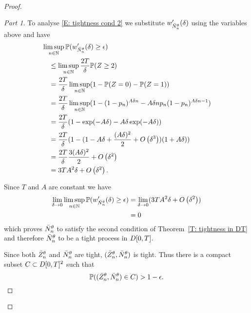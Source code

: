 \begin{proof}
\begin{proof}[Part 1]
To analyse \eqref{E: tightness cond 2} we substitute $w'_{\bar{N}_n^{\theta}}(\delta)$ using the variables above and have
\begin{equation}
\begin{aligned}
&\limsup_{n \in \mathbb{N}}\mathbb{P}(w'_{\bar{N}_n^{\theta}}(\delta) \geq \epsilon ) \\
&\quad\leq \limsup_{n \in \mathbb{N}}\frac{2T}{\delta} \mathbb{P}( Z \geq 2 ) \\
&\quad= \frac{2T}{\delta} \limsup_{n \in \mathbb{N}}(1 - \mathbb{P}( Z = 0 ) - \mathbb{P}( Z = 1 )) \\
&\quad= \frac{2T}{\delta} \limsup_{n \in \mathbb{N}}(1 - (1- p_n)^{A\delta n} - A\delta n p_n (1 - p_n)^{A\delta n - 1}) \\
&\quad= \frac{2T}{\delta} (1 - \exp(-A\delta) - A\delta\exp(-A\delta) ) \\
&\quad= \frac{2T}{\delta}(  1 - (1- A\delta + \frac{(A\delta)^2}{2} + O\left(\delta^3\right))(1 + A\delta ) ) \\
&\quad= \frac{2T}{\delta} \frac{3(A\delta)^2}{2} + O\left(\delta^2\right) \\
&\quad= 3TA^2\delta + O\left(\delta^2\right).
\end{aligned}
\end{equation}

Since $T$ and $A$ are constant we have
\begin{equation}
	\begin{aligned}
	\lim_{\delta \rightarrow 0} \limsup_{n \in \mathbb{N}}\mathbb{P}(w'_{\bar{N}_n^{\theta}}(\delta) \geq \epsilon ) 
	&= \lim_{\delta \rightarrow 0} ( 3TA^2\delta + O\left(\delta^2\right) )\\
	&= 0
	\end{aligned}
\end{equation}
which proves $\bar{N}_n^{\theta}$ to satisfy the second condition of Theorem~\ref{T: tightness in DT}
and therefore $\bar{N}_n^{\theta}$ to be a tight process in $D[0, T]$.

Since both $\bar{Z}^{\theta}_n$ and $\bar{N}_n^{\theta}$ are tight, $(\bar{Z}^{\theta}_n, \bar{N}_n^{\theta})$ is tight.
Thus there is a compact subset $C \subset D[0, T]^2$ such that
\begin{equation}
	\mathbb{P}( (\bar{Z}^{\theta}_n, \bar{N}_n^{\theta}) \in C) > 1 - \epsilon.
\end{equation}
\end{proof}




\end{proof}

